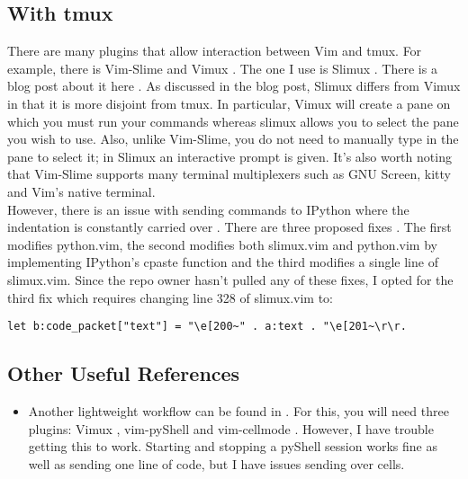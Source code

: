 \documentclass[10pt]{article}
\begin{document}
\subsection{With tmux}
There are many plugins that allow interaction between Vim and tmux. For example, there is Vim-Slime
\cite{jpalardy2012slime} and Vimux \cite{benmills2009vimux}. The one I use is Slimux \cite{esamattis2015slimux}. There
is a blog post about it here \cite{suuronen2012slimux}. As discussed in the blog post, Slimux differs from Vimux in
that it is more disjoint from tmux. In particular, Vimux will create a pane on which you must run your commands whereas
slimux allows you to select the pane you wish to use. Also, unlike Vim-Slime, you do not need to manually type in the
pane to select it; in Slimux an interactive prompt is given. It's also worth noting that Vim-Slime supports many
terminal multiplexers such as GNU Screen, kitty and Vim's native terminal.\\

However, there is an issue with sending commands to IPython where the indentation is constantly carried over
\cite{kmARC2015indentationerror}. There are three proposed fixes
\cite{lotabout2017remove,karadaharu2016add,zcesur2018fix}. The first modifies python.vim, the second modifies both
slimux.vim and python.vim by implementing IPython's cpaste function and the third modifies a single line of slimux.vim.
Since the repo owner hasn't pulled any of these fixes, I opted for the third fix which requires changing line 328 of
slimux.vim to:
\begin{lstlisting}
let b:code_packet["text"] = "\e[200~" . a:text . "\e[201~\r\r.
\end{lstlisting}


\subsection{Other Useful References}
\begin{itemize}
    \item Another lightweight workflow can be found in \cite{hornung2019boosting}. For this, you will need three
        plugins: Vimux \cite{benmills2009vimux}, vim-pyShell \cite{hornung2019pyShell} and vim-cellmode
        \cite{julienr2016vimcellmode}. However, I have trouble getting this to work. Starting and stopping a pyShell
        session works fine as well as sending one line of code, but I have issues sending over cells.
\end{itemize}


\nocite{*}


\end{document}
